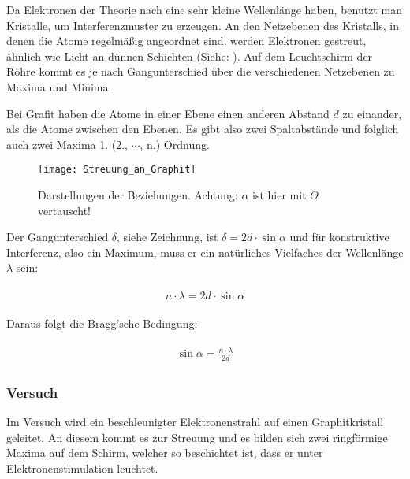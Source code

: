 Da Elektronen der Theorie nach eine sehr kleine Wellenlänge haben, benutzt man Kristalle, um Interferenzmuster zu erzeugen. An den Netzebenen des Kristalls, in denen die Atome regelmäßig angeordnet sind, werden Elektronen gestreut, ähnlich wie Licht an dünnen Schichten (Siehe: ). Auf dem Leuchtschirm der Röhre kommt es je nach Gangunterschied über die verschiedenen Netzebenen zu Maxima und Minima.

\begin{Wichtig}
	Bei Grafit haben die Atome in einer Ebene einen anderen Abstand $d$ zu einander, als die Atome zwischen den Ebenen. Es gibt also zwei \glqq Spaltabstände\grqq{} und folglich auch zwei Maxima 1. (2., $\cdots$, n.) Ordnung.
\end{Wichtig}

\begin{figure}[h!]
	\centering 
	\texttt{[image: Streuung\_an\_Graphit]}
	\caption{Darstellungen der Beziehungen. Achtung: $\alpha$ ist hier mit $\Theta$ vertauscht!}
	\label{fig:e-angrafit}
\end{figure}

Der Gangunterschied $\delta$, siehe Zeichnung, ist $\delta = 2d \cdot \sin{\alpha}$ und für konstruktive Interferenz, also ein Maximum, muss er ein natürliches Vielfaches der Wellenlänge $\lambda$ sein:

\begin{align}
\begin{split}
	n \cdot \lambda = 2d \cdot \sin{\alpha}
\end{split}
\end{align}

\noindent Daraus folgt die Bragg'sche Bedingung:

\begin{align}
\begin{split}
	\sin{\alpha} = \frac{n \cdot \lambda}{2d}
\end{split}
\end{align}


\subsubsection{Versuch}

Im Versuch wird ein beschleunigter Elektronenstrahl auf einen Graphitkristall geleitet. An diesem kommt es zur Streuung und es bilden sich zwei ringförmige Maxima auf dem Schirm, welcher so beschichtet ist, dass er unter Elektronenstimulation leuchtet.

